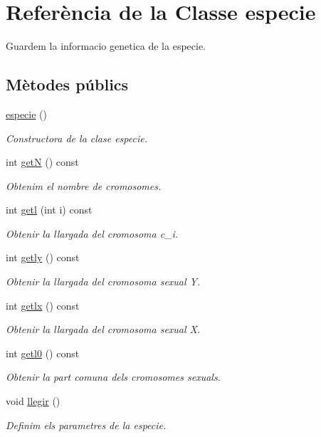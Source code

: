 \hypertarget{classespecie}{}\section{Referència de la Classe especie}
\label{classespecie}


Guardem la informacio genetica de la especie.  


\subsection*{Mètodes públics}
\begin{DoxyCompactItemize}
\item 
\hyperlink{classespecie_ac172ff6414744de38a9995de5b8960e6}{especie} ()
\begin{DoxyCompactList}\small\item\em Constructora de la clase especie. \end{DoxyCompactList}\item 
int \hyperlink{classespecie_a1af7a5322803c26b43fc5b83e089f6d1}{getN} () const 
\begin{DoxyCompactList}\small\item\em Obtenim el nombre de cromosomes. \end{DoxyCompactList}\item 
int \hyperlink{classespecie_aeafc7d55dc12d3a0337740884117614c}{getl} (int i) const 
\begin{DoxyCompactList}\small\item\em Obtenir la llargada del cromosoma c\+\_\+i. \end{DoxyCompactList}\item 
int \hyperlink{classespecie_a45ce91dbe80e60d7498e672dd487d7ed}{getly} () const 
\begin{DoxyCompactList}\small\item\em Obtenir la llargada del cromosoma sexual Y. \end{DoxyCompactList}\item 
int \hyperlink{classespecie_a884d4a0b074c42391c6e4295666047e0}{getlx} () const 
\begin{DoxyCompactList}\small\item\em Obtenir la llargada del cromosoma sexual X. \end{DoxyCompactList}\item 
int \hyperlink{classespecie_a712aef06aad58b482d136980200600f5}{getl0} () const 
\begin{DoxyCompactList}\small\item\em Obtenir la part comuna dels cromosomes sexuals. \end{DoxyCompactList}\item 
void \hyperlink{classespecie_af1a08ff40fdb79abb1d78c06b8131306}{llegir} ()
\begin{DoxyCompactList}\small\item\em Definim els parametres de la especie. \end{DoxyCompactList}\end{DoxyCompactItemize}

